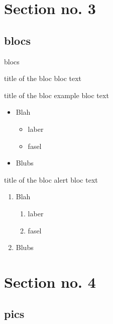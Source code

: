 \documentclass{beamer}
\begin{document}
\section{Section no. 3}

\subsection{blocs}

\begin{frame}{blocs}
	\begin{block}{title of the bloc}
		bloc text
	\end{block}

	\begin{exampleblock}{title of the bloc}
		example bloc text
		\begin{itemize}
			\item Blah
			\begin{itemize}
				\item laber
				\item fasel
			\end{itemize}
			\item Blubs
		\end{itemize}
	\end{exampleblock}


	\begin{alertblock}{title of the bloc}
		alert bloc text
		\begin{enumerate}
			\item Blah
			\begin{enumerate}
				\item laber
				\item fasel
			\end{enumerate}
			\item Blubs
		\end{enumerate}
	\end{alertblock}
\end{frame}

\section{Section no. 4}

\subsection{pics}
\end{document}
